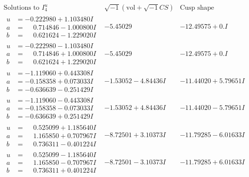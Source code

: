 \documentclass[1p]{elsarticle_modified}
\theoremstyle{definition}
\newcommand{\I}{\sqrt{-1}}
\begin{document}
$$\begin{array}{c|c|c}  
\text{Solutions to }I^u_{4}& \I (\text{vol} + \sqrt{-1}CS) & \text{Cusp shape}\\
 \hline 
\begin{aligned}
u &= -0.222980 + 1.103480 I \\
a &= \phantom{-}0.714846 - 1.000800 I \\
b &= \phantom{-}0.621624 - 1.229020 I\end{aligned}
 & -5.45029\phantom{ +0.000000I} & -12.49575 + 0. I\phantom{ +0.000000I} \\ \hline\begin{aligned}
u &= -0.222980 - 1.103480 I \\
a &= \phantom{-}0.714846 + 1.000800 I \\
b &= \phantom{-}0.621624 + 1.229020 I\end{aligned}
 & -5.45029\phantom{ +0.000000I} & -12.49575 + 0. I\phantom{ +0.000000I} \\ \hline\begin{aligned}
u &= -1.119060 + 0.443308 I \\
a &= -0.158358 + 0.073033 I \\
b &= -0.636639 - 0.251429 I\end{aligned}
 & -1.53052 - 4.84436 I & -11.44020 + 5.79651 I \\ \hline\begin{aligned}
u &= -1.119060 - 0.443308 I \\
a &= -0.158358 - 0.073033 I \\
b &= -0.636639 + 0.251429 I\end{aligned}
 & -1.53052 + 4.84436 I & -11.44020 - 5.79651 I \\ \hline\begin{aligned}
u &= \phantom{-}0.525099 + 1.185640 I \\
a &= \phantom{-}1.165850 + 0.707967 I \\
b &= \phantom{-}0.736311 - 0.401224 I\end{aligned}
 & -8.72501 + 3.10373 I & -11.79285 - 6.01633 I \\ \hline\begin{aligned}
u &= \phantom{-}0.525099 - 1.185640 I \\
a &= \phantom{-}1.165850 - 0.707967 I \\
b &= \phantom{-}0.736311 + 0.401224 I\end{aligned}
 & -8.72501 - 3.10373 I & -11.79285 + 6.01633 I \\ \hline\begin{aligned}

\end{aligned}
\end{array}$$
\end{document}
